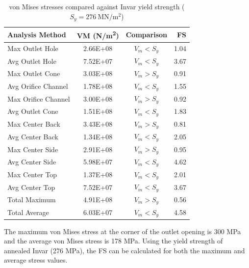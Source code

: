 \documentclass[12pt, letterpaper]{report}%
\begin{document}
	\vspace{1em}
	\begin{table}[h]
		\centering
    \caption{von Mises stresses compared against Invar yield strength
    ($S_y = \SI{276}{\mega\newton\per\meter\squared}$)}
		\label{tab:FEAdisp2}
		\begin{tabular}{l S[table-format=1.2e+2] c r}
			\toprule
			{Analysis Method} & {VM (\si{N/m^2})} & {Comparison} & {FS} \\
			\midrule
			Max Outlet Hole     & 2.66E+08 & $V_m < S_y$ & 1.04 \\
			Avg Outlet Hole      & 7.52E+07 & $V_m < S_y$ & 3.67 \\
			Max Outlet Cone     & 3.03E+08 & $V_m > S_y$ & 0.91 \\
			Avg Orifice Channel  & 1.78E+08 & $V_m < S_y$ & 1.55 \\
			Max Orifice Channel & 3.00E+08 & $V_m > S_y$ & 0.92 \\
			Avg Outlet Cone      & 1.51E+08 & $V_m < S_y$ & 1.83 \\
			Max Center Back     & 3.43E+08 & $V_m > S_y$ & 0.81 \\
			Avg Center Back      & 1.34E+08 & $V_m < S_y$ & 2.05 \\
			Max Center Side     & 2.91E+08 & $V_m > S_y$ & 0.95 \\
			Avg Center Side      & 5.98E+07 & $V_m < S_y$ & 4.62 \\
			Max Center Top      & 1.37E+08 & $V_m < S_y$ & 2.01 \\
			Avg Center Top       & 7.52E+07 & $V_m < S_y$ & 3.67 \\
			Total Maximum                & 4.91E+08 & $V_m > S_y$ & 0.56 \\
			Total Average                 & 6.03E+07 & $V_m < S_y$ & 4.58 \\
			\bottomrule
		\end{tabular}
	\end{table}
	


	The maximum von Mises stress at the corner of the outlet opening is 300 MPa and the average von Mises stress is 178 MPa. Using the yield strength of annealed Invar (276 MPa), 
	the FS can be calculated for both the maximum and average stress values.
	
\end{document}
